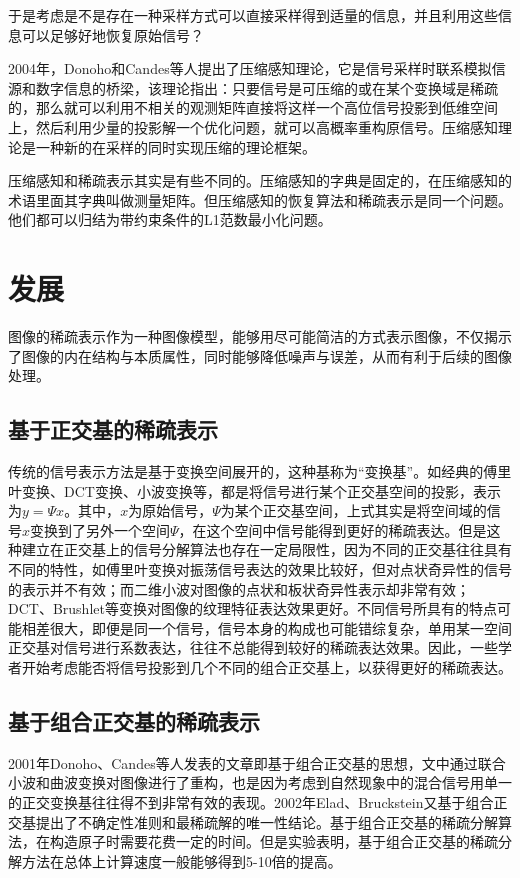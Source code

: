 \documentclass[a4paper,12pt]{article}
\begin{document}
于是考虑是不是存在一种采样方式可以直接采样得到适量的信息，并且利用这些信息可以足够好地恢复原始信号？

2004年，Donoho和Candes等人提出了压缩感知理论，它是信号采样时联系模拟信源和数字信息的桥梁，该理论指出：只要信号是可压缩的或在某个变换域是稀疏的，那么就可以利用不相关的观测矩阵直接将这样一个高位信号投影到低维空间上，然后利用少量的投影解一个优化问题，就可以高概率重构原信号。压缩感知理论是一种新的在采样的同时实现压缩的理论框架。

压缩感知和稀疏表示其实是有些不同的。压缩感知的字典是固定的，在压缩感知的术语里面其字典叫做测量矩阵。但压缩感知的恢复算法和稀疏表示是同一个问题。他们都可以归结为带约束条件的L1范数最小化问题。

\section{发展}

图像的稀疏表示作为一种图像模型，能够用尽可能简洁的方式表示图像，不仅揭示了图像的内在结构与本质属性，同时能够降低噪声与误差，从而有利于后续的图像处理。

\subsection{基于正交基的稀疏表示}

传统的信号表示方法是基于变换空间展开的，这种基称为“变换基”。如经典的傅里叶变换、DCT变换、小波变换等，都是将信号进行某个正交基空间的投影，表示为$y=\Psi x$。其中，$x$为原始信号，$\Psi$为某个正交基空间，上式其实是将空间域的信号$x$变换到了另外一个空间$\Psi$，在这个空间中信号能得到更好的稀疏表达。但是这种建立在正交基上的信号分解算法也存在一定局限性，因为不同的正交基往往具有不同的特性，如傅里叶变换对振荡信号表达的效果比较好，但对点状奇异性的信号的表示并不有效；而二维小波对图像的点状和板状奇异性表示却非常有效；DCT、Brushlet等变换对图像的纹理特征表达效果更好。不同信号所具有的特点可能相差很大，即便是同一个信号，信号本身的构成也可能错综复杂，单用某一空间正交基对信号进行系数表达，往往不总能得到较好的稀疏表达效果。因此，一些学者开始考虑能否将信号投影到几个不同的组合正交基上，以获得更好的稀疏表达。

\subsection{基于组合正交基的稀疏表示}

2001年Donoho、Candes等人发表的文章即基于组合正交基的思想，文中通过联合小波和曲波变换对图像进行了重构，也是因为考虑到自然现象中的混合信号用单一的正交变换基往往得不到非常有效的表现。2002年Elad、Bruckstein又基于组合正交基提出了不确定性准则和最稀疏解的唯一性结论。基于组合正交基的稀疏分解算法，在构造原子时需要花费一定的时间。但是实验表明，基于组合正交基的稀疏分解方法在总体上计算速度一般能够得到5-10倍的提高。
\end{document}
